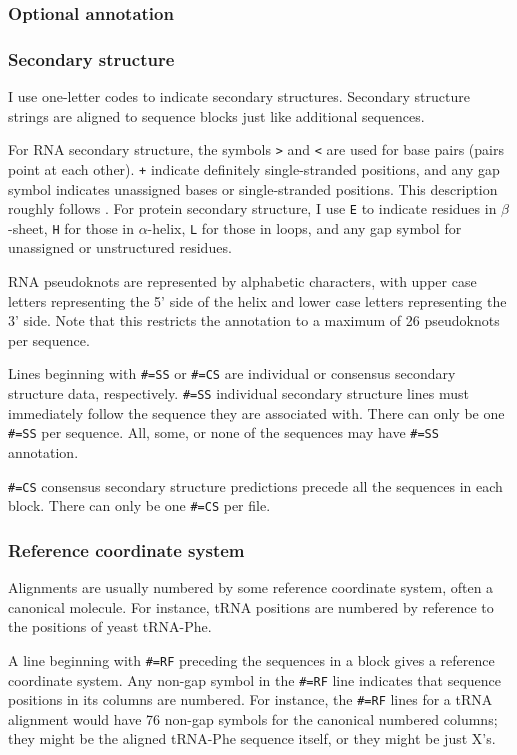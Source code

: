 \subsubsection {Optional annotation}

\subsubsection {Secondary structure}

I use one-letter codes to indicate secondary structures. Secondary
structure strings are aligned to sequence blocks just like additional
sequences.

For RNA secondary structure, the symbols \verb+>+ and \verb+<+ are
used for base pairs (pairs point at each other).  \verb-+- indicate
definitely single-stranded positions, and any gap symbol indicates
unassigned bases or single-stranded positions.  This description
roughly follows \cite{Konings89}.  For protein secondary structure, I
use {\tt E} to indicate residues in $\beta$-sheet, {\tt H} for those
in $\alpha$-helix, {\tt L} for those in loops, and any gap symbol for
unassigned or unstructured residues.

RNA pseudoknots are represented by alphabetic characters, with upper
case letters representing the 5' side of the helix and lower case
letters representing the 3' side. Note that this restricts the
annotation to a maximum of 26 pseudoknots per sequence.

Lines beginning with \verb+#=SS+ or \verb+#=CS+ are individual or
consensus secondary structure data, respectively.  \verb+#=SS+
individual secondary structure lines must immediately follow the
sequence they are associated with.  There can only be one \verb+#=SS+
per sequence. All, some, or none of the sequences may have \verb+#=SS+
annotation.

\verb+#=CS+ consensus secondary structure predictions precede all the
sequences in each block. There can only be one \verb+#=CS+ per file.

\subsubsection {Reference coordinate system}

Alignments are usually numbered by some reference coordinate system,
often a canonical molecule. For instance, tRNA positions are numbered
by reference to the positions of yeast tRNA-Phe.

A line beginning with \verb+#=RF+ preceding the sequences in a block
gives a reference coordinate system. Any non-gap symbol in the
\verb+#=RF+ line indicates that sequence positions in its columns are
numbered. For instance, the \verb+#=RF+ lines for a tRNA alignment
would have 76 non-gap symbols for the canonical numbered columns; they
might be the aligned tRNA-Phe sequence itself, or they might be just
X's.

